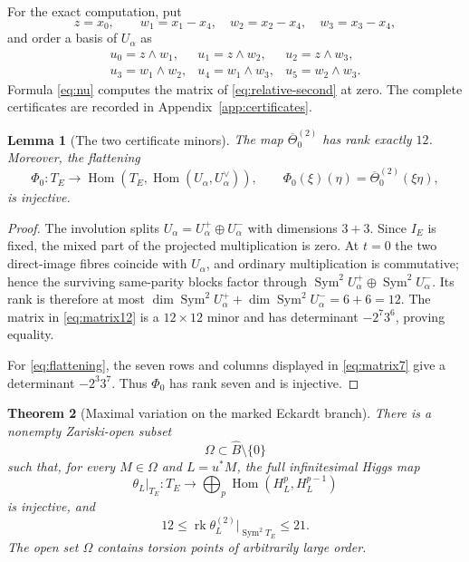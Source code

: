 \documentclass[11pt,reqno]{amsart}
\numberwithin{equation}{section}
\newtheorem{theorem}{Theorem}[section]
\newtheorem{lemma}[theorem]{Lemma}
\theoremstyle{definition}
\theoremstyle{remark}
\newcommand{\rk}{\operatorname{rk}}
\newcommand{\Sym}{\operatorname{Sym}}
\newcommand{\Hom}{\operatorname{Hom}}
\begin{document}
For the exact computation, put
\[
z=x_0,
\qquad
w_1=x_1-x_4,
\quad w_2=x_2-x_4,
\quad w_3=x_3-x_4,
\]
and order a basis of $U_\alpha$ as
\begin{equation}\label{eq:ubasis}
\begin{array}{lll}
u_0=z\wedge w_1,&u_1=z\wedge w_2,&u_2=z\wedge w_3,\\
u_3=w_1\wedge w_2,&u_4=w_1\wedge w_3,&u_5=w_2\wedge w_3.
\end{array}
\end{equation}
Formula \eqref{eq:nu} computes the matrix of \eqref{eq:relative-second} at zero.  The complete certificates are recorded in Appendix~\ref{app:certificates}.

\begin{lemma}[The two certificate minors]\label{lem:minors}
The map $\overline\Theta^{(2)}_0$ has rank exactly $12$.  Moreover, the flattening
\begin{equation}\label{eq:flattening}
\Phi_0:T_E\longrightarrow
\Hom\!\left(T_E,\Hom(U_\alpha,U_\alpha^\vee)\right),
\qquad
\Phi_0(\xi)(\eta)=\overline\Theta^{(2)}_0(\xi\eta),
\end{equation}
is injective.
\end{lemma}

\begin{proof}
The involution splits $U_\alpha=U_\alpha^+\oplus U_\alpha^-$ with dimensions $3+3$.  Since $I_E$ is fixed, the mixed part of the projected multiplication is zero.  At $t=0$ the two direct-image fibres coincide with $U_\alpha$, and ordinary multiplication is commutative; hence the surviving same-parity blocks factor through $\Sym^2U_\alpha^+\oplus\Sym^2U_\alpha^-$.  Its rank is therefore at most
$\dim\Sym^2U_\alpha^++\dim\Sym^2U_\alpha^-=6+6=12$.
The matrix in \eqref{eq:matrix12} is a $12\times12$ minor and has determinant
$-2^7 3^6$, proving equality.

For \eqref{eq:flattening}, the seven rows and columns displayed in
\eqref{eq:matrix7} give a determinant $-2^3 3^7$.  Thus $\Phi_0$ has rank seven and is injective.
\end{proof}

\begin{theorem}[Maximal variation on the marked Eckardt branch]\label{thm:eckardt-main}
There is a nonempty Zariski-open subset
\[
\Omega\subset\widehat B\setminus\{0\}
\]
such that, for every $M\in\Omega$ and $L=u^*M$, the full infinitesimal Higgs map
\begin{equation}\label{eq:first-higgs}
\theta_L|_{T_E}:T_E\longrightarrow
\bigoplus_p\Hom(H_L^p,H_L^{p-1})
\end{equation}
is injective, and
\begin{equation}\label{eq:rank-range}
12\le\rk\theta_L^{(2)}|_{\Sym^2T_E}\le21.
\end{equation}
The open set $\Omega$ contains torsion points of arbitrarily large order.
\end{theorem}
\end{document}
